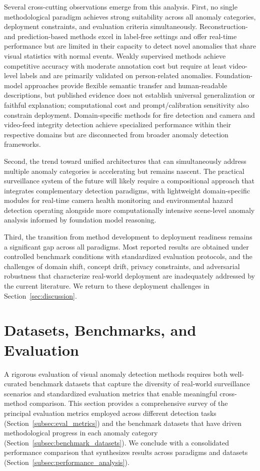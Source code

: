 \documentclass[10pt,a4paper]{article}
\begin{document}
Several cross-cutting observations emerge from this analysis. First, no single methodological paradigm achieves strong suitability across all anomaly categories, deployment constraints, and evaluation criteria simultaneously. Reconstruction- and prediction-based methods excel in label-free settings and offer real-time performance but are limited in their capacity to detect novel anomalies that share visual statistics with normal events. Weakly supervised methods achieve competitive accuracy with moderate annotation cost but require at least video-level labels and are primarily validated on person-related anomalies. Foundation-model approaches provide flexible semantic transfer and human-readable descriptions, but published evidence does not establish universal generalization or faithful explanation; computational cost and prompt/calibration sensitivity also constrain deployment. Domain-specific methods for fire detection and camera and video-feed integrity detection achieve specialized performance within their respective domains but are disconnected from broader anomaly detection frameworks.

Second, the trend toward unified architectures that can simultaneously address multiple anomaly categories is accelerating but remains nascent. The practical surveillance system of the future will likely require a compositional approach that integrates complementary detection paradigms, with lightweight domain-specific modules for real-time camera health monitoring and environmental hazard detection operating alongside more computationally intensive scene-level anomaly analysis informed by foundation model reasoning.

Third, the transition from method development to deployment readiness remains a significant gap across all paradigms. Most reported results are obtained under controlled benchmark conditions with standardized evaluation protocols, and the challenges of domain shift, concept drift, privacy constraints, and adversarial robustness that characterize real-world deployment are inadequately addressed by the current literature. We return to these deployment challenges in Section~\ref{sec:discussion}.


\section{Datasets, Benchmarks, and Evaluation}
\label{sec:datasets}

A rigorous evaluation of visual anomaly detection methods requires both well-curated benchmark datasets that capture the diversity of real-world surveillance scenarios and standardized evaluation metrics that enable meaningful cross-method comparison. This section provides a comprehensive survey of the principal evaluation metrics employed across different detection tasks (Section~\ref{subsec:eval_metrics}) and the benchmark datasets that have driven methodological progress in each anomaly category (Section~\ref{subsec:benchmark_datasets}). We conclude with a consolidated performance comparison that synthesizes results across paradigms and datasets (Section~\ref{subsec:performance_analysis}).
\end{document}
